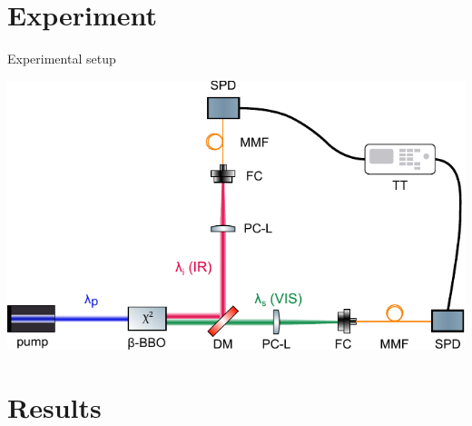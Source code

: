 \documentclass[10pt,aspectratio=43]{beamer}
\begin{document}
	\section{Experiment}
	\begin{frame}{Experimental setup}
			\begin{center}
				\includegraphics[width=.7\textwidth]{Images/DupishSetupNew.pdf}
			\end{center}
			
	\end{frame}
	
	
	\section{Results}
	
\end{document}
